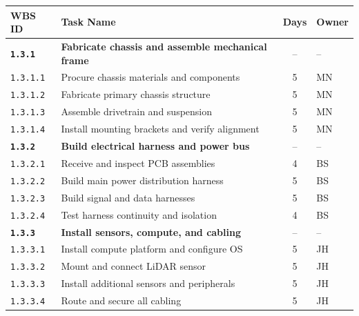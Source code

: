 \newpage
\begin{table}[H]
\centering
\small
\begin{tabular} {
  | l | p{6.5cm} | c | l |
}
\hline
\rowcolor { buildorange !40 }
\textbf{WBS ID} & \textbf{Task Name} & \textbf{Days} & \textbf { Owner }
\\
\hline
\rowcolor { buildorange !35 }
\texttt{\textbf{1.3.1}} & \textbf{Fabricate chassis and
                                  assemble mechanical frame} &
    --&-- \\
\hline
\rowcolor {
  white
}
\texttt{1.3.1.1} & \quad Procure chassis materials and components & 5 & MN \\
\hline
\rowcolor {
  buildorange !15
}
\texttt{1.3.1.2} & \quad Fabricate primary chassis structure & 5 & MN \\
\hline
\rowcolor {
  white
}
\texttt{1.3.1.3} & \quad Assemble drivetrain and suspension & 5 & MN \\
\hline
\rowcolor {
  buildorange !15
}
\texttt{1.3.1.4} & \quad Install mounting brackets and verify alignment & 5 & MN \\
\hline
\rowcolor {
  buildorange !35
}
\texttt{\textbf{1.3.2}} & \textbf{Build electrical harness and power bus} &
    --&-- \\
\hline
\rowcolor {
  white
}
\texttt{1.3.2.1} & \quad Receive and inspect PCB assemblies & 4 & BS \\
\hline
\rowcolor {
  buildorange !15
}
\texttt{1.3.2.2} & \quad Build main power distribution harness & 5 & BS \\
\hline
\rowcolor {
  white
}
\texttt{1.3.2.3} & \quad Build signal and data harnesses & 5 & BS \\
\hline
\rowcolor {
  buildorange !15
}
\texttt{1.3.2.4} & \quad Test harness continuity and isolation & 4 & BS \\
\hline
\rowcolor {
  buildorange !35
}
\texttt{\textbf{1.3.3}} & \textbf{Install sensors, compute, and cabling} & --&-- \\
\hline
\rowcolor {
  white
}
\texttt{1.3.3.1} & \quad Install compute platform and configure OS & 5 & JH \\
\hline
\rowcolor {
  buildorange !15
}
\texttt{1.3.3.2} & \quad Mount and connect LiDAR sensor & 5 & JH \\
\hline
\rowcolor {
  white
}
\texttt{1.3.3.3} & \quad Install additional sensors and peripherals & 5 & JH \\
\hline
\rowcolor {
  buildorange !15
}
\texttt{1.3.3.4} & \quad Route and secure all cabling & 5 & JH \\

\end{tabular}
\end{table}
